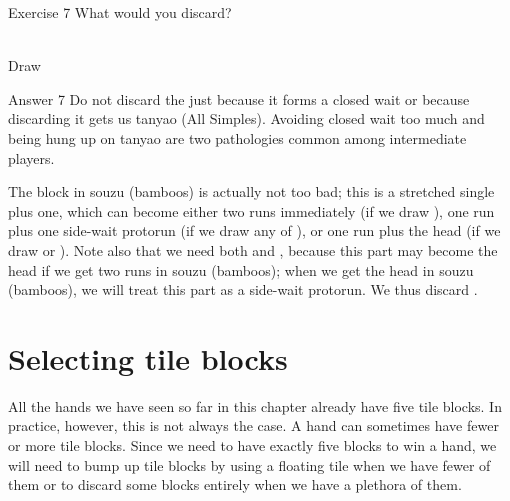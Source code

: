 \vfill

\begin{itembox}[l]{Exercise 7}
What would you discard?
\vspace{-10pt}

\bp
{}~\\
\hfill\footnotesize{Draw~~~~~~~~~~~}
\ep
\end{itembox}

\newpage


\begin{itembox}[r]{Answer 7}
\emj
Do not discard the {\LARGE{}} just because it forms a closed wait or because discarding it gets us {\jap tanyao} (All Simples). Avoiding closed wait too much and being hung up on {\jap tanyao} are two pathologies common among intermediate players.
\bigskip

The block in {\jap souzu} (bamboos) is actually not too bad; this is a stretched single plus one, which can become either two runs immediately (if we draw {\LARGE{}}), one run plus one side-wait protorun (if we draw any of {\LARGE{}}), or one run plus the head (if we draw {\LARGE{}} or {\LARGE{}}). Note also that we need both {\LARGE{}} and {\LARGE{}}, because this part may become the head if we get two runs in {\jap souzu} (bamboos); when we get the head in {\jap souzu} (bamboos), we will treat this part as a side-wait protorun. We thus discard {\LARGE{}}.
\end{itembox}


\newpage

\section{Selecting tile blocks}
All the hands we have seen so far in this chapter already have five tile blocks. In practice, however, this is not always the case. A hand can sometimes have fewer or more tile blocks. Since we need to have exactly five blocks to win a hand, we will need to bump up tile blocks by using a floating tile when we have fewer of them or to discard some blocks entirely when we have a plethora of them.

